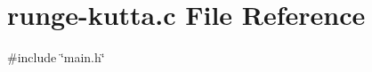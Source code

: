 \hypertarget{runge-kutta_8c}{}\section{runge-\/kutta.c File Reference}
\label{runge-kutta_8c}
{\ttfamily \#include \char`\"{}main.\+h\char`\"{}}\newline
